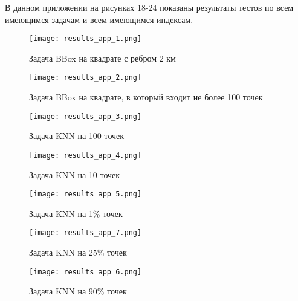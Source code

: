 
В данном приложении на рисунках 18-24 показаны результаты тестов по всем имеющимся задачам и всем имеющимся индексам. 

\par\vspace{1em}

\begin{figure}[H]
    \centering
    \texttt{[image: results\_app\_1.png]}
    \caption{Задача BBox на квадрате с ребром 2 км}
\end{figure}

\par\vspace{1em}

\begin{figure}[H]
    \centering
    \texttt{[image: results\_app\_2.png]}
    \caption{Задача BBox на квадрате, в который входит не более 100 точек}
\end{figure}

\par\vspace{1em}

\begin{figure}[H]
    \centering
    \texttt{[image: results\_app\_3.png]}
    \caption{Задача KNN на 100 точек}
\end{figure}

\par\vspace{1em}

\begin{figure}[H]
    \centering
    \texttt{[image: results\_app\_4.png]}
    \caption{Задача KNN на 10 точек}
\end{figure}

\par\vspace{1em}

\begin{figure}[H]
    \centering
    \texttt{[image: results\_app\_5.png]}
    \caption{Задача KNN на 1\% точек}
\end{figure}

\par\vspace{1em}

\begin{figure}[H]
    \centering
    \texttt{[image: results\_app\_7.png]}
    \caption{Задача KNN на 25\% точек}
\end{figure}

\par\vspace{1em}

\begin{figure}[H]
    \centering
    \texttt{[image: results\_app\_6.png]}
    \caption{Задача KNN на 90\% точек}
\end{figure}

